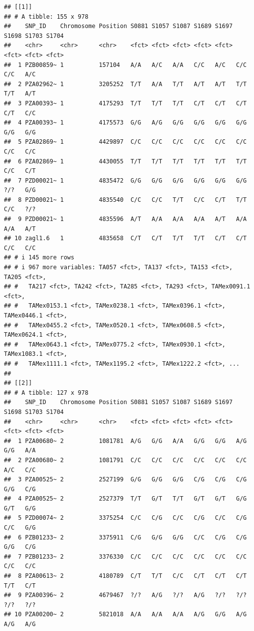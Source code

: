 \documentclass[
]{article}
\begin{document}
\begin{verbatim}
## [[1]]
## # A tibble: 155 x 978
##    SNP_ID    Chromosome Position S0881 S1057 S1087 S1689 S1697 S1698 S1703 S1704
##    <chr>     <chr>      <chr>    <fct> <fct> <fct> <fct> <fct> <fct> <fct> <fct>
##  1 PZB00859~ 1          157104   A/A   A/C   A/A   C/C   A/C   C/C   C/C   A/C  
##  2 PZA02962~ 1          3205252  T/T   A/A   T/T   A/T   A/T   T/T   T/T   A/T  
##  3 PZA00393~ 1          4175293  T/T   T/T   T/T   C/T   C/T   C/T   C/T   C/C  
##  4 PZA00393~ 1          4175573  G/G   A/G   G/G   G/G   G/G   G/G   G/G   G/G  
##  5 PZA02869~ 1          4429897  C/C   C/C   C/C   C/C   C/C   C/C   C/C   C/C  
##  6 PZA02869~ 1          4430055  T/T   T/T   T/T   T/T   T/T   T/T   C/C   C/T  
##  7 PZD00021~ 1          4835472  G/G   G/G   G/G   G/G   G/G   G/G   ?/?   G/G  
##  8 PZD00021~ 1          4835540  C/C   C/C   T/T   C/C   C/T   T/T   C/C   ?/?  
##  9 PZD00021~ 1          4835596  A/T   A/A   A/A   A/A   A/T   A/A   A/A   A/T  
## 10 zagl1.6   1          4835658  C/T   C/T   T/T   T/T   C/T   C/T   C/C   C/C  
## # i 145 more rows
## # i 967 more variables: TA057 <fct>, TA137 <fct>, TA153 <fct>, TA205 <fct>,
## #   TA217 <fct>, TA242 <fct>, TA285 <fct>, TA293 <fct>, TAMex0091.1 <fct>,
## #   TAMex0153.1 <fct>, TAMex0238.1 <fct>, TAMex0396.1 <fct>, TAMex0446.1 <fct>,
## #   TAMex0455.2 <fct>, TAMex0520.1 <fct>, TAMex0608.5 <fct>, TAMex0624.1 <fct>,
## #   TAMex0643.1 <fct>, TAMex0775.2 <fct>, TAMex0930.1 <fct>, TAMex1083.1 <fct>,
## #   TAMex1111.1 <fct>, TAMex1195.2 <fct>, TAMex1222.2 <fct>, ...
## 
## [[2]]
## # A tibble: 127 x 978
##    SNP_ID    Chromosome Position S0881 S1057 S1087 S1689 S1697 S1698 S1703 S1704
##    <chr>     <chr>      <chr>    <fct> <fct> <fct> <fct> <fct> <fct> <fct> <fct>
##  1 PZA00680~ 2          1081781  A/G   G/G   A/A   G/G   G/G   A/G   G/G   A/A  
##  2 PZA00680~ 2          1081791  C/C   C/C   C/C   C/C   C/C   C/C   A/C   C/C  
##  3 PZA00525~ 2          2527199  G/G   G/G   G/G   C/G   C/G   C/G   G/G   C/G  
##  4 PZA00525~ 2          2527379  T/T   G/T   T/T   G/T   G/T   G/G   G/T   G/G  
##  5 PZD00074~ 2          3375254  C/C   C/G   C/C   C/G   C/C   C/G   C/C   G/G  
##  6 PZB01233~ 2          3375911  C/G   G/G   G/G   C/C   C/G   C/G   G/G   C/G  
##  7 PZB01233~ 2          3376330  C/C   C/C   C/C   C/C   C/C   C/C   C/C   C/C  
##  8 PZA00613~ 2          4180789  C/T   T/T   C/C   C/T   C/T   C/T   T/T   C/T  
##  9 PZA00396~ 2          4679467  ?/?   A/G   ?/?   A/G   ?/?   ?/?   ?/?   ?/?  
## 10 PZA00200~ 2          5821018  A/A   A/A   A/A   A/G   G/G   A/G   A/G   A/G  

\end{verbatim}
\end{document}
